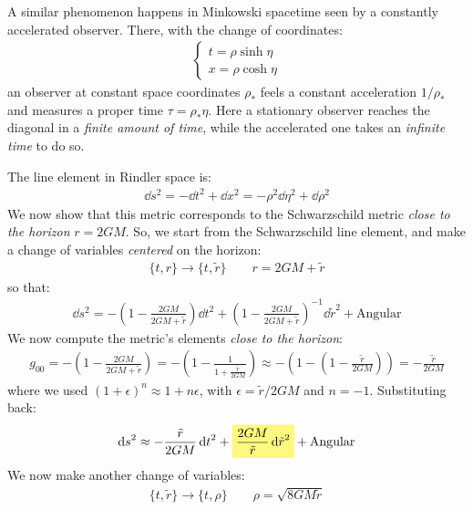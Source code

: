 \documentclass[../template.tex]{subfiles}
\begin{document}
A similar phenomenon happens in Minkowski spacetime seen by a constantly accelerated observer. There, with the change of coordinates:
\begin{align*}
    \begin{cases}
        t = \rho \sinh \eta\\
        x = \rho \cosh \eta
    \end{cases}
\end{align*}
an observer at constant space coordinates $\rho_*$ feels a constant acceleration $1/\rho_*$ and measures a proper time $\tau = \rho_* \eta$. Here a stationary observer reaches the diagonal in a \textit{finite amount of time}, while the accelerated one takes an \textit{infinite time} to do so.

The line element in Rindler space is:
\begin{align*}
    \dd{s}^2 = -\dd{t}^2 + \dd{x}^2 = -\rho^2 \dd{\eta}^2 + \dd{\rho}^2
\end{align*}
We now show that this metric corresponds to the Schwarzschild metric \textit{close to the horizon} $r = 2GM$. So, we start from the Schwarzschild line element, and make a change of variables \textit{centered} on the horizon:
\begin{align*}
    \{t,r\} \to \{t, \tilde{r}\} \qquad r= 2GM + \tilde{r}
\end{align*}   
so that:
\begin{align*}
    \dd{s}^2 = -\left(1-\frac{2GM}{2GM + \tilde{r}} \right) \dd{t}^2 + \left(1-\frac{2GM}{2GM + \tilde{r}} \right)^{-1} \dd{\tilde{r}}^2 + \text{Angular}
\end{align*}
We now compute the metric's elements \textit{close to the horizon}:
\begin{align*}
    g_{00} = -\left(1-\frac{2GM}{2GM + \tilde{r}} \right) = -\left(1-\frac{1}{1+ \frac{\tilde{r}}{2GM} } \right) \approx -\left(1-\left(1-\frac{\tilde{r}}{2 GM} \right)\right) = -\frac{\tilde{r}}{2GM} 
\end{align*} 
where we used $(1+\epsilon)^n \approx 1+ n \epsilon$, with $\epsilon = \tilde{r}/2GM$ and $n=-1$. Substituting back:
\begin{align*}
    \dd{s}^2 \approx -\frac{\tilde{r}}{2GM} \dd{t}^2 + \hlc{Yellow}{\frac{2GM}{\tilde{r}} \dd{\tilde{r}}^2} + \text{Angular} 
\end{align*}   
We now make another change of variables:
\begin{align*}
    \{t,\tilde{r}\} \to \{t, \rho\} \qquad \rho = \sqrt{8GM \tilde{r}}
\end{align*}
\end{document}
